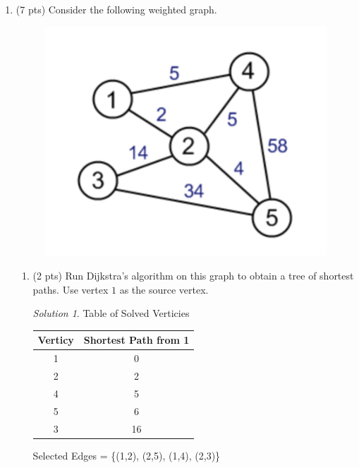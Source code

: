 \documentclass[12pt]{article}
\theoremstyle{remark}
\newtheorem*{solution}{Solution}
\begin{document}
\hrulefill

\newpage
\begin{enumerate}
\item (7 pts) Consider the following weighted graph. 
\begin{figure}[h!]
\begin{center}
\includegraphics[scale=0.3]{PS5aQ1.png} 
\end{center}
\end{figure}

\begin{enumerate}[label=(\alph*)]
\item (2 pts) Run Dijkstra's algorithm on this graph to obtain a tree of shortest paths. Use vertex $1$ as the source vertex.
\begin{solution}
Table of Solved Verticies
\begin{center}
\begin{tabular}{ |c|c|} 
 \hline
 Verticy & Shortest Path from 1 \\ 
\hline
 1 & 0 \\ 
 2 & 2 \\ 
 4 & 5 \\
 5 & 6 \\ 
 3 & 16 \\
 \hline
\end{tabular}
\end{center}
Selected Edges = \{(1,2), (2,5), (1,4), (2,3)\}
\end{solution}
\pagebreak



\end{enumerate}
\end{enumerate}
\end{document}
